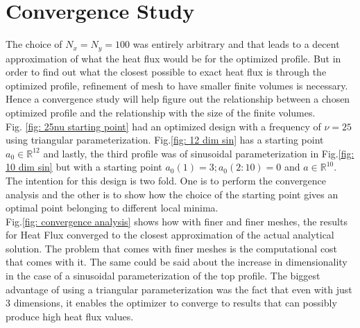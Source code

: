 \documentclass{article}
\begin{document}
\section{Convergence Study}
The choice of $N_x = N_y = 100$ was entirely arbitrary and that leads to a decent approximation of what the heat flux would be for the optimized profile. But in order to find out what the closest possible to exact heat flux is through the optimized profile, refinement of mesh to have smaller finite volumes is necessary. Hence a convergence study will help figure out the relationship between a chosen optimized profile and the relationship with the size of the finite volumes. \\
Fig. \ref{fig: 25nu starting point} had an optimized design with a frequency of $\nu = 25$ using triangular parameterization. Fig.\ref{fig: 12 dim sin} has a starting point $a_0 \in \mathbb{R}^{12}$ and lastly, the third profile was of sinusoidal parameterization in Fig.\ref{fig: 10 dim sin} but with a starting point $a_0(1) = 3; a_0(2:10) = 0 $ and $a \in \mathbb{R}^{10}$. The intention for this design is two fold. One is to perform the convergence analysis and the other is to show how the choice of the starting point gives an optimal point belonging to different local minima. \\
Fig.\ref{fig: convergence analysis} shows how with finer and finer meshes, the results for Heat Flux converged to the closest approximation of the actual analytical solution. The problem that comes with finer meshes is the computational cost that comes with it. The same could be said about the increase in dimensionality in the case of a sinusoidal parameterization of the top profile. The biggest advantage of using a triangular parameterization was the fact that even with just 3 dimensions, it enables the optimizer to converge to results that can possibly produce high heat flux values. 
\end{document}
